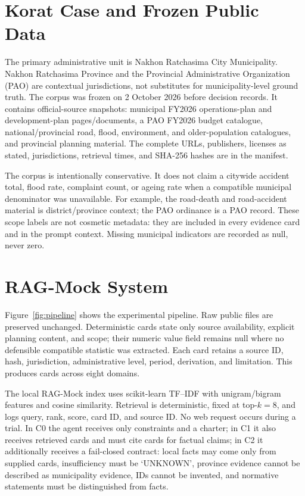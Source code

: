 \documentclass[sigconf,anonymous]{acmart}
\begin{document}
\section{Korat Case and Frozen Public Data}
The primary administrative unit is Nakhon Ratchasima City Municipality. Nakhon Ratchasima Province and the Provincial Administrative Organization (PAO) are contextual jurisdictions, not substitutes for municipality-level ground truth. The corpus was frozen on 2 October 2026 before decision records. It contains \SourceCount official-source snapshots: municipal FY2026 operations-plan and development-plan pages/documents, a PAO FY2026 budget catalogue, national/provincial road, flood, environment, and older-population catalogues, and provincial planning material. The complete URLs, publishers, licenses as stated, jurisdictions, retrieval times, and SHA-256 hashes are in the manifest.

The corpus is intentionally conservative. It does not claim a citywide accident total, flood rate, complaint count, or ageing rate when a compatible municipal denominator was unavailable. For example, the road-death and road-accident material is district/province context; the PAO ordinance is a PAO record. These scope labels are not cosmetic metadata: they are included in every evidence card and in the prompt context. Missing municipal indicators are recorded as null, never zero.

\section{RAG-Mock System}
Figure~\ref{fig:pipeline} shows the experimental pipeline. Raw public files are preserved unchanged. Deterministic cards state only source availability, explicit planning content, and scope; their numeric value field remains null where no defensible compatible statistic was extracted. Each card retains a source ID, hash, jurisdiction, administrative level, period, derivation, and limitation. This produces \CardCount cards across eight domains.

The local RAG-Mock index uses scikit-learn TF--IDF with unigram/bigram features and cosine similarity. Retrieval is deterministic, fixed at top-$k=8$, and logs query, rank, score, card ID, and source ID. No web request occurs during a trial. In C0 the agent receives only constraints and a charter; in C1 it also receives retrieved cards and must cite cards for factual claims; in C2 it additionally receives a fail-closed contract: local facts may come only from supplied cards, insufficiency must be `UNKNOWN', province evidence cannot be described as municipality evidence, IDs cannot be invented, and normative statements must be distinguished from facts.
\end{document}
